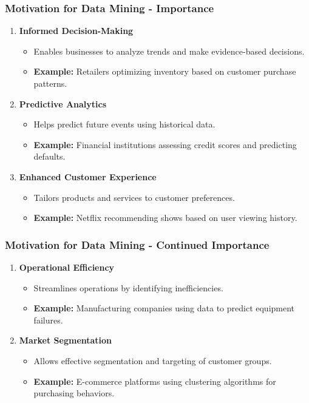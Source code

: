 \documentclass[aspectratio=169]{beamer}
\begin{document}
\begin{frame}[fragile]
    \frametitle{Motivation for Data Mining - Importance}
    \begin{enumerate}
        \item \textbf{Informed Decision-Making}
            \begin{itemize}
                \item Enables businesses to analyze trends and make evidence-based decisions.
                \item \textbf{Example:} Retailers optimizing inventory based on customer purchase patterns.
            \end{itemize}
        \item \textbf{Predictive Analytics}
            \begin{itemize}
                \item Helps predict future events using historical data.
                \item \textbf{Example:} Financial institutions assessing credit scores and predicting defaults.
            \end{itemize}
        \item \textbf{Enhanced Customer Experience}
            \begin{itemize}
                \item Tailors products and services to customer preferences.
                \item \textbf{Example:} Netflix recommending shows based on user viewing history.
            \end{itemize}
    \end{enumerate}
\end{frame}

\begin{frame}[fragile]
    \frametitle{Motivation for Data Mining - Continued Importance}
    \begin{enumerate}[resume]
        \item \textbf{Operational Efficiency}
            \begin{itemize}
                \item Streamlines operations by identifying inefficiencies.
                \item \textbf{Example:} Manufacturing companies using data to predict equipment failures.
            \end{itemize}
        \item \textbf{Market Segmentation}
            \begin{itemize}
                \item Allows effective segmentation and targeting of customer groups.
                \item \textbf{Example:} E-commerce platforms using clustering algorithms for purchasing behaviors.
            \end{itemize}
    \end{enumerate}
\end{frame}
\end{document}
